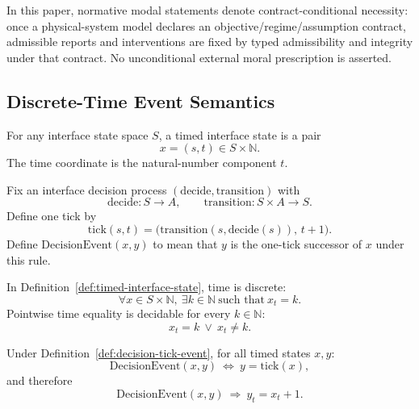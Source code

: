 \begin{remark}\label{rem:modal-should}
In this paper, normative modal statements denote contract-conditional necessity: once a physical-system model declares an objective/regime/assumption contract, admissible reports and interventions are fixed by typed admissibility and integrity under that contract.
No unconditional external moral prescription is asserted.
\end{remark}

\subsection{Discrete-Time Event Semantics}\label{sec:discrete-time-semantics}

\begin{definition}\label{def:timed-interface-state}
For any interface state space $S$, a timed interface state is a pair
\[
x=(s,t)\in S\times \mathbb{N}.
\]
The time coordinate is the natural-number component $t$.
\end{definition}

\begin{definition}\label{def:decision-tick-event}
Fix an interface decision process $(\mathrm{decide},\mathrm{transition})$ with
\[
\mathrm{decide}:S\to A,\qquad \mathrm{transition}:S\times A\to S.
\]
Define one tick by
\[
\mathrm{tick}(s,t)=\bigl(\mathrm{transition}(s,\mathrm{decide}(s)),\,t+1\bigr).
\]
Define $\mathrm{DecisionEvent}(x,y)$ to mean that $y$ is the one-tick successor of $x$ under this rule.
\end{definition}

\begin{proposition}\label{prop:time-discrete}
In Definition~\ref{def:timed-interface-state}, time is discrete:
\[
\forall x\in S\times\mathbb{N},\ \exists k\in\mathbb{N}\ \text{such that}\ x_t=k.
\]
Pointwise time equality is decidable for every $k\in\mathbb{N}$:
\[
x_t=k\ \vee\ x_t\neq k.
\]
\end{proposition}

\begin{proposition}\label{prop:decision-unit-time}
Under Definition~\ref{def:decision-tick-event}, for all timed states $x,y$:
\[
\mathrm{DecisionEvent}(x,y)\ \Longleftrightarrow\ y=\mathrm{tick}(x),
\]
and therefore
\[
\mathrm{DecisionEvent}(x,y)\ \Longrightarrow\ y_t=x_t+1.
\]
\end{proposition}

